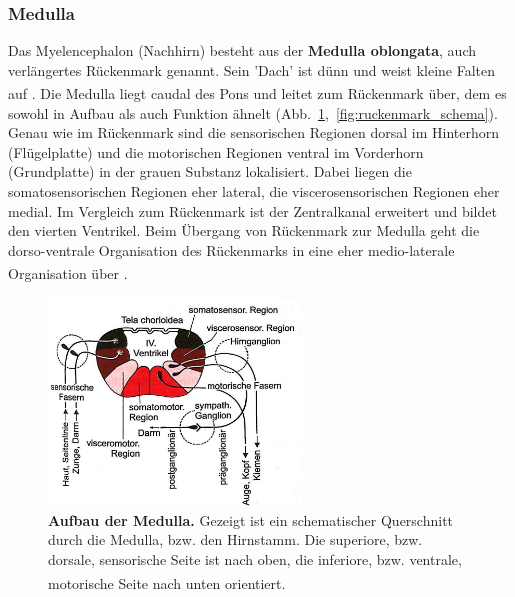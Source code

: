 \documentclass[12pt,a4paper,pdftex]{article}
\begin{document}
\subsubsection{Medulla} 

Das Myelencephalon (Nachhirn) besteht aus der \textbf{Medulla oblongata}, auch verlängertes Rückenmark genannt. Sein 'Dach' ist dünn und weist kleine Falten auf \textsuperscript{\cite[6]{storch2012lehrbuchzoo}}. Die Medulla liegt caudal des Pons und leitet zum Rückenmark über, dem es sowohl in Aufbau als auch Funktion ähnelt (Abb.~\ref{fig:medulla_schema},~\ref{fig:ruckenmark_schema}). Genau wie im Rückenmark sind die sensorischen Regionen dorsal im Hinterhorn (Flügelplatte) und die motorischen Regionen ventral im Vorderhorn (Grundplatte) in der grauen Substanz lokalisiert. Dabei liegen die somatosensorischen Regionen eher lateral, die viscerosensorischen Regionen eher medial. Im Vergleich zum Rückenmark ist der Zentralkanal erweitert und bildet den vierten Ventrikel. Beim Übergang von Rückenmark zur Medulla geht die dorso-ventrale Organisation des Rückenmarks in eine eher medio-laterale  Organisation über \textsuperscript{\cite[14]{penzlin2005tierphys}}.

\begin{figure}[H]
    \centering
    \includegraphics[width=0.6\textwidth]{pictures/Bilder_Jule/Andere/medulla_schema.jpg}
    \caption[Aufbau der Medulla]{\textbf{Aufbau der Medulla.} Gezeigt ist ein schematischer Querschnitt durch die Medulla, bzw. den Hirnstamm. Die superiore, bzw. dorsale, sensorische Seite ist nach oben, die inferiore, bzw. ventrale, motorische Seite nach unten orientiert. {\textsuperscript{\cite[14]{penzlin2005tierphys}}}}
    \label{fig:medulla_schema}
\end{figure}{}
\end{document}
